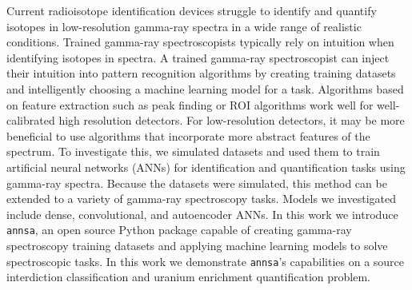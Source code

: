 Current radioisotope identification devices struggle to identify and quantify isotopes in low-resolution gamma-ray spectra in a wide range of realistic conditions. Trained gamma-ray spectroscopists typically rely on intuition when identifying isotopes in spectra. A trained gamma-ray spectroscopist can inject their intuition into pattern recognition algorithms by creating training datasets and intelligently choosing a machine learning model for a task. Algorithms based on feature extraction such as peak finding or ROI algorithms work well for well-calibrated high resolution detectors. For low-resolution detectors, it may be more beneficial to use algorithms that incorporate more abstract features of the spectrum. To investigate this, we simulated datasets and used them to train artificial neural networks (ANNs) for identification and quantification tasks using gamma-ray spectra. Because the datasets were simulated, this method can be extended to a variety of gamma-ray spectroscopy tasks. Models we investigated include dense, convolutional, and autoencoder ANNs. In this work we introduce \verb|annsa|, an open source Python package capable of creating gamma-ray spectroscopy training datasets and applying machine learning models to solve spectroscopic tasks. In this work we demonstrate \verb|annsa|'s capabilities on a source interdiction classification and uranium enrichment quantification problem.
